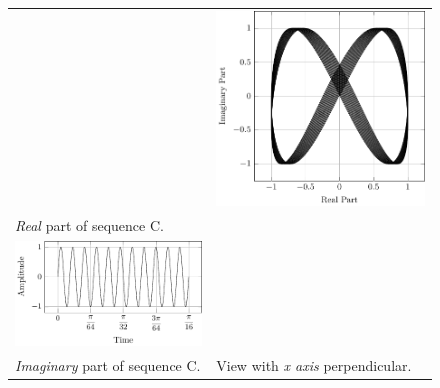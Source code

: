 \documentclass[../../course]{subfiles}
\begin{document}
\begin{figure} [H]
\begin{NiceTabularX} {\textwidth} {
            *{2}{>{\centering\arraybackslash}X}
        }
        &

         {
             {
                \includegraphics[height = \textheight] {tikzpics/plotFrontViewComplexC.pdf}
            }
        }

        \\

         {\emph{Real} part of sequence C.}
        \label{plt:realCmplxC}

        &
        \\

         {
             {
                \includegraphics[height = \textheight] {tikzpics/plotShortX3.pdf}
            }
        }

        &
        \\

         {\emph{Imaginary} part of sequence C.}
        \label{plt:imagCmplxC}

        &

         {View with \emph{x axis} perpendicular.}
        \label{plt:frontViewCmplxC}

        \\

    \end{NiceTabularX}

\end{figure}
\end{document}

